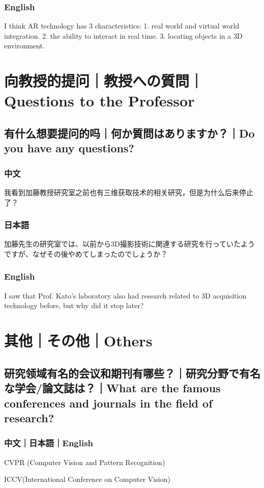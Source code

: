 \documentclass[lang=cn,11pt,a4paper]{elegantpaper}
\begin{document}
\subsubsection{English}
I think AR technology has 3 characteristics: 1. real world and virtual world integration. 2. the ability to interact in real time. 3. locating objects in a 3D environment.

\section{向教授的提问｜教授への質問｜Questions to the Professor}
\subsection{有什么想要提问的吗｜何か質問はありますか？｜Do you have any questions?}
\subsubsection{中文}
我看到加藤教授研究室之前也有三维获取技术的相关研究，但是为什么后来停止了？
\subsubsection{日本語}
加藤先生の研究室では、以前から3D撮影技術に関連する研究を行っていたようですが、なぜその後やめてしまったのでしょうか？
\subsubsection{English}
I saw that Prof. Kato's laboratory also had research related to 3D acquisition technology before, but why did it stop later?
\section{其他｜その他｜Others}
\subsection{研究领域有名的会议和期刊有哪些？｜研究分野で有名な学会/論文誌は？｜What are the famous conferences and journals in the field of research?}
\subsubsection{中文｜日本語｜English}
CVPR (Computer Vision and Pattern Recognition)

ICCV(International Conference on Computer Vision)
\end{document}
